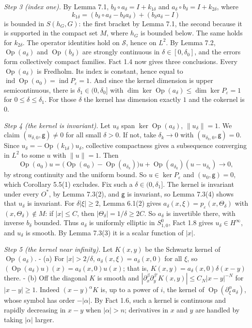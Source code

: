 \documentclass[
  11pt,
]{article}
\begin{document}
\emph{Step 3 (index one).} By Lemma 7.1,
\(b_\delta\circ a_\delta=I+k_{1\delta}\) and
\(a_\delta\circ b_\delta=I+k_{2\delta}\), where \[
k_{1\delta}=(b_\delta\circ a_\delta-b_\delta a_\delta)+(b_\delta a_\delta-I)
\] is bounded in \(S(h_G,G)\): the first bracket by Lemma 7.1, the
second because it is supported in the compact set \(M\), where \(h_G\)
is bounded below. The same holds for \(k_{2\delta}\). The operator
identities hold on \(\mathcal S\), hence on \(L^2\). By Lemma 7.2,
\(\operatorname{Op}(a_\delta)\) and \(\operatorname{Op}(b_\delta)\) are
strongly continuous in \(\delta\in[0,\delta_0]\), and the errors form
collectively compact families. Fact 1.4 now gives three conclusions.
Every \(\operatorname{Op}(a_\delta)\) is Fredholm. Its index is
constant, hence equal to
\(\operatorname{ind}\operatorname{Op}(a_0)=\operatorname{ind}P_\varepsilon=1\).
And since the kernel dimension is upper semicontinuous, there is
\(\delta_1\in(0,\delta_0]\) with
\(\dim\ker\operatorname{Op}(a_\delta)\le\dim\ker P_\varepsilon=1\) for
\(0\le\delta\le\delta_1\). For those \(\delta\) the kernel has dimension
exactly \(1\) and the cokernel is \(0\).

\emph{Step 4 (the kernel is invariant).} Let \(u_\delta\) span
\(\ker\operatorname{Op}(a_\delta)\), \(\|u_\delta\|=1\). We claim
\((u_{\delta,0},\mathsf g)\ne0\) for all small \(\delta>0\). If not,
take \(\delta_k\to0\) with \((u_{\delta_k,0},\mathsf g)=0\). Since
\(u_\delta=-\operatorname{Op}(k_{1\delta})u_\delta\), collective
compactness gives a subsequence converging in \(L^2\) to some \(u\) with
\(\|u\|=1\). Then \[
\operatorname{Op}(a_0)u=\bigl(\operatorname{Op}(a_0)-\operatorname{Op}(a_{\delta_k})\bigr)u+\operatorname{Op}(a_{\delta_k})(u-u_{\delta_k})\to0,
\] by strong continuity and the uniform bound. So
\(u\in\ker P_\varepsilon\) and \((u_0,\mathsf g)=0\), which Corollary
5.5(1) excludes. Fix such a \(\delta\in(0,\delta_1]\). The kernel is
invariant under every \(O^*\), by Lemma 7.3(2), and \(\mathsf g\) is
invariant, so Lemma 7.3(4) shows that \(u_\delta\) is invariant. For
\(\delta|\xi|\ge2\), Lemma 6.1(2) gives
\(a_\delta(x,\xi)=p_\varepsilon(x,\Theta_\delta)\) with
\((x,\Theta_\delta)\notin M\): if \(|x|\le C\), then
\(|\Theta_\delta|=1/\delta\ge2C\). So \(a_\delta\) is invertible there,
with inverse \(b_\delta\) bounded. Thus \(a_\delta\) is uniformly
elliptic in \(S^0_{1,0}\), Fact 1.8 gives \(u_\delta\in H^\infty\), and
\(u_\delta\) is smooth. By Lemma 7.3(3) it is a scalar function of
\(|x|\).

\emph{Step 5 (the kernel near infinity).} Let \(K(x,y)\) be the Schwartz
kernel of \(\operatorname{Op}(a_\delta)\). - (a) For \(|x|>2/\delta\),
\(a_\delta(x,\xi)=a_\delta(x,0)\) for all \(\xi\), so
\((\operatorname{Op}(a_\delta)u)(x)=a_\delta(x,0)u(x)\); that is,
\(K(x,y)=a_\delta(x,0)\delta(x-y)\) there. - (b) Off the diagonal \(K\)
is smooth and
\(|\partial_x^\beta\partial_y^{\beta'}K(x,y)|\le C_N|x-y|^{-N}\) for
\(|x-y|\ge1\). Indeed \((x-y)^\alpha K\) is, up to a power of \(i\), the
kernel of \(\operatorname{Op}(\partial_\xi^\alpha a_\delta)\), whose
symbol has order \(-|\alpha|\). By Fact 1.6, such a kernel is continuous
and rapidly decreasing in \(x-y\) when \(|\alpha|>n\); derivatives in
\(x\) and \(y\) are handled by taking \(|\alpha|\) larger.
\end{document}
